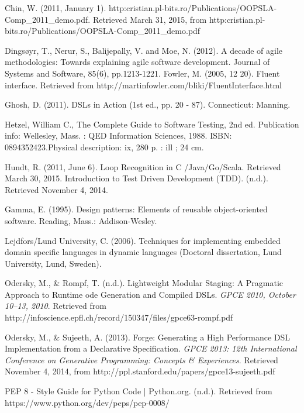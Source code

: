 \begin{thebibliography}{9}

 Chin, W. (2011, January 1). http:\/\/cristian.pl-bits.ro/Publications/OOPSLA-Comp\_2011\_demo.pdf. Retrieved March 31, 2015, from http:\/\/cristian.pl-bits.ro/Publications/OOPSLA-Comp\_2011\_demo.pdf

 Dingsøyr, T., Nerur, S., Balijepally, V. and Moe, N. (2012). A decade of agile methodologies: Towards explaining agile software development. Journal of Systems and Software, 85(6), pp.1213-1221.
 Fowler, M. (2005, 12 20). Fluent interface. 
Retrieved from http://martinfowler.com/bliki/FluentInterface.html

Ghosh, D. (2011). DSLs in Action (1st ed., pp. 20 - 87). Connecticut: Manning.

 Hetzel, William C., The Complete Guide to Software Testing, 2nd ed. Publication info: Wellesley, Mass. : QED Information Sciences, 1988. ISBN: 0894352423.Physical description: ix, 280 p. : ill ; 24 cm.

 Hundt, R. (2011, June 6). Loop Recognition in C /Java/Go/Scala. Retrieved March 30, 2015.
 Introduction to Test Driven Development (TDD). (n.d.). Retrieved November 4, 2014.

 Gamma, E. (1995). Design patterns: Elements of reusable object-oriented software. Reading, Mass.: Addison-Wesley.

 Lejdfors/Lund University, C. (2006). Techniques for implementing embedded domain specific languages in dynamic languages (Doctoral dissertation, Lund University, Lund, Sweden).

 Odersky, M., \& Rompf, T. (n.d.). Lightweight Modular Staging: 
A Pragmatic Approach to Runtime ode Generation and Compiled DSLs. \textit{GPCE 2010, October 10–13, 2010}. Retrieved from http://infoscience.epfl.ch/record/150347/files/gpce63-rompf.pdf

 Odersky, M., \& Sujeeth, A. (2013). Forge: Generating a 
High Performance DSL Implementation from a Declarative Speciﬁcation. \textit{GPCE 2013: 12th International Conference on Generative Programming: Concepts \& Experiences}. Retrieved November 4, 2014, from http://ppl.stanford.edu/papers/gpce13-sujeeth.pdf

 PEP 8 - Style Guide for Python Code | Python.org. (n.d.). Retrieved from https://www.python.org/dev/peps/pep-0008/


\end{thebibliography}
